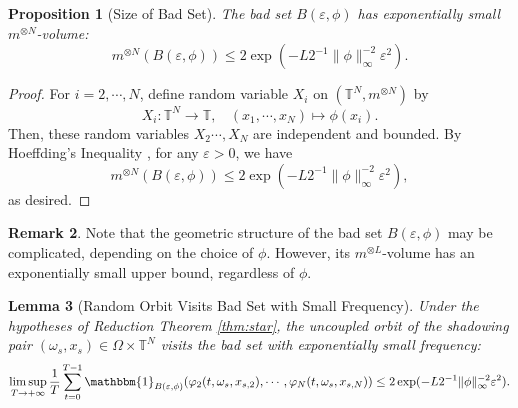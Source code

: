 \documentclass[a4paper]{article}
\theoremstyle{plain}
\newtheorem{theorem}{Theorem}[section] %
\newtheorem{lemma}[theorem]{Lemma}
\newtheorem{prop} [theorem]{Proposition}
\theoremstyle{definition}
\newtheorem{rem}[theorem]{Remark}
\newcommand{\E}{\mathbb{E}}
\newcommand{\PP}{\mathbb{P}}
\newcommand{\R}{\mathbb{R}}
\newcommand{\T}{\mathbb{T}}
\newcommand{\One}{\mathbbm{1}}
\begin{document}

\begin{prop}[Size of Bad Set]\label{prop:sizebadset}
	The bad set $B(\varepsilon,\phi)$ has exponentially small $m^{\otimes N}$-volume:
	$$m^{\otimes N} (B(\varepsilon,\phi))\leq 2\exp(-L2^{-1}\|\phi\|_{\infty}^{-2} \varepsilon^2).$$
\end{prop}

\begin{proof}
	For $i=2,\cdots, N$, define random variable $X_i$ on $(\T^N, m^{\otimes N})$ by 
	$$ X_i:\T^N\to\T,~~~~(x_1,\cdots,x_N)\mapsto \phi(x_i).$$
	Then, these random variables $X_2\cdots,X_N$ are independent and bounded.  By Hoeffding's Inequality \cite[Theorem 2.2.2]{Vershynin2018}, for any $\varepsilon>0$, we have
	$$m^{\otimes N} (B(\varepsilon,\phi))\leq 
	2\exp(-L2^{-1}\|\phi\|_{\infty}^{-2} \varepsilon^2),$$
	as desired.
\end{proof}


\begin{rem}
	Note that the geometric structure of the bad set $B(\varepsilon,\phi)$ may be complicated, depending on the choice of $\phi$. However, its $m^{\otimes L}$-volume has an exponentially small upper bound, regardless of $\phi$. 
\end{rem}




\begin{lemma}[Random Orbit Visits Bad Set with Small Frequency]\label{lemma:RDSvisitfreq} Under the hypotheses of Reduction Theorem \ref{thm:star}, the uncoupled orbit of the shadowing pair $(\omega_{{s}},x_{{s}})\in \Omega\times \T^{N}$ visits the bad set with exponentially small frequency:
	$$\limsup_{T\to+\infty} \frac{1}{T}\sum_{t=0}^{T-1} \One_{B(\varepsilon,\phi)}  (\varphi_2(t,\omega_{{s}},x_{{s},2}),\cdots,\varphi_N(t,\omega_{{s}},x_{{s},N}) )\leq 2\exp(-L2^{-1}\|\phi\|_{\infty}^{-2} \varepsilon^2).$$
\end{lemma}
\end{document}
